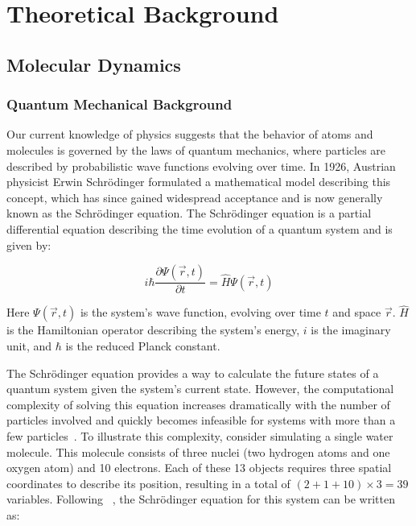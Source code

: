 \chapter{Theoretical Background}
\label{sec:theoretical_background}


\section{Molecular Dynamics}

\subsection{Quantum Mechanical Background}

Our current knowledge of physics suggests that the behavior of atoms and molecules is governed by the laws of quantum mechanics, where particles are described by probabilistic wave functions evolving over time. In 1926, Austrian physicist Erwin Schrödinger formulated a mathematical model describing this concept, which has since gained widespread acceptance and is now generally known as the Schrödinger equation. The Schrödinger equation is a partial differential equation describing the time evolution of a quantum system and is given by:

\begin{equation}
      i \hbar \frac{\partial \Psi(\vec{r}, t)}{\partial t} = \hat{H} \Psi(\vec{r}, t)
\end{equation}

Here $\Psi(\vec{r}, t)$ is the system's wave function, evolving over time $t$ and space $\vec{r}$. $\hat{H}$ is the Hamiltonian operator describing the system's energy, $i$ is the imaginary unit, and $\hbar$ is the reduced Planck constant.
\smallskip

The Schrödinger equation provides a way to calculate the future states of a quantum system given the system's current state. However, the computational complexity of solving this equation increases dramatically with the number of particles involved and quickly becomes infeasible for systems with more than a few particles~\cite{Leimkuhler2015}. To illustrate this complexity, consider simulating a single water molecule. This molecule consists of three nuclei (two hydrogen atoms and one oxygen atom) and 10 electrons. Each of these 13 objects requires three spatial coordinates to describe its position, resulting in a total of $(2+1+10) \times 3 = 39$ variables. Following ~\cite{Leimkuhler2015}, the Schrödinger equation for this system can be written as:

